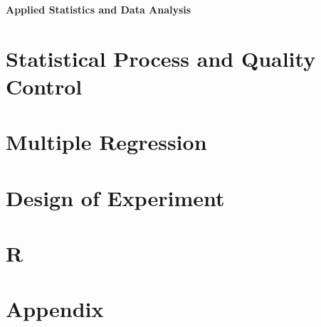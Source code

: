 \documentclass[10pt]{article}
\begin{document}
\footnotesize

\begin{center}
\Large{\textbf{Applied Statistics and Data Analysis}} \\
\end{center}
\begin{multicols*}{2}
\setlength{\premulticols}{1pt}
\setlength{\postmulticols}{1pt}
\setlength{\multicolsep}{1pt}
\setlength{\columnsep}{2pt}


\part{Statistical Process and Quality Control}






\part{Multiple Regression}






\part{Design of Experiment}





\part{R}


% 

\newpage

\part*{Appendix}


\end{multicols*}
\end{document}
